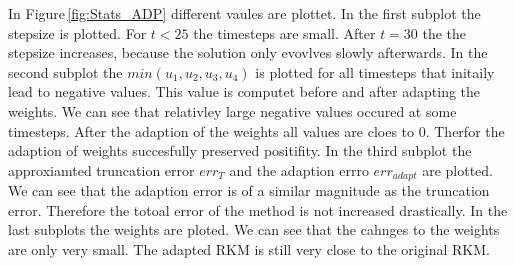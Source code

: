 \documentclass[a4paper]{scrartcl}
\numberwithin{equation}{section}
\theoremstyle{plain}
\theoremstyle{definition}
\numberwithin{theorem}{section}
\newcommand{\1}{\mathbbm{1}}
\begin{document}
In Figure\,\ref{fig:Stats_ADP} different vaules are plottet. 
In the first subplot the stepsize is plotted. For $t<25$ the timesteps are small. After $t = 30$ the the stepsize increases, because the solution only evovlves slowly afterwards.
In the second subplot the $min(u_1,u_2,u_3,u_4)$ is plotted for all timesteps that initaily lead to negative values. This value is computet before and after adapting the weights. 
We can see that relativley large negative values occured at some timesteps.
After the adaption of the weights all values are cloes to $0$. Therfor the adaption of weights succesfully preserved positifity.
In the third subplot the approxiamted truncation error $err_T$ and the adaption errro $err_{adapt}$ are plotted.
We can see that the adaption error is of a similar magnitude as the truncation error. Therefore the totoal error of the method is not increased drastically. 
In the last subplots the weights are ploted. 
We can see that the cahnges to the weights are only very small. The adapted RKM is still very close to the original RKM.
\end{document}
